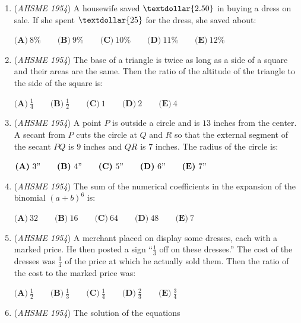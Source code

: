 \begin{enumerate}
 $\textbf{(A)}\ 1 \frac{13}{16} \qquad \textbf{(B)}\ 1 \frac{3}{16} \qquad \textbf{(C)}\ 1 \qquad \textbf{(D)}\ \frac{7}{8}\qquad\textbf{(E)}\ \frac{1}{16}$


	\item (\textit{AHSME 1954}) A housewife saved $\textdollar{2.50}$ in buying a dress on sale. If she spent $\textdollar{25}$ for the dress, she saved about: 


 $\textbf{(A)}\ 8 \% \qquad \textbf{(B)}\ 9 \% \qquad \textbf{(C)}\ 10 \% \qquad \textbf{(D)}\ 11 \% \qquad \textbf{(E)}\ 12\%$


	\item (\textit{AHSME 1954}) The base of a triangle is twice as long as a side of a square and their areas are the same. 
Then the ratio of the altitude of the triangle to the side of the square is: 


 $\textbf{(A)}\ \frac{1}{4} \qquad \textbf{(B)}\ \frac{1}{2} \qquad \textbf{(C)}\ 1 \qquad \textbf{(D)}\ 2 \qquad \textbf{(E)}\ 4$


	\item (\textit{AHSME 1954}) A point $P$ is outside a circle and is $13$ inches from the center. A secant from $P$ cuts the circle at $Q$ and $R$ 
so that the external segment of the secant $PQ$ is $9$ inches and $QR$ is $7$ inches. The radius of the circle is: 


 $\textbf{(A)}\ 3" \qquad \textbf{(B)}\ 4" \qquad \textbf{(C)}\ 5" \qquad \textbf{(D)}\ 6"\qquad\textbf{(E)}\ 7"$


	\item (\textit{AHSME 1954}) The sum of the numerical coefficients in the expansion of the binomial $(a+b)^6$ is: 


 $\textbf{(A)}\ 32 \qquad \textbf{(B)}\ 16 \qquad \textbf{(C)}\ 64 \qquad \textbf{(D)}\ 48 \qquad \textbf{(E)}\ 7$


	\item (\textit{AHSME 1954}) A merchant placed on display some dresses, each with a marked price. He then posted a sign “$\frac{1}{3}$ off on these dresses.” 
The cost of the dresses was $\frac{3}{4}$ of the price at which he actually sold them. Then the ratio of the cost to the marked price was: 


 $\textbf{(A)}\ \frac{1}{2} \qquad \textbf{(B)}\ \frac{1}{3} \qquad \textbf{(C)}\ \frac{1}{4} \qquad \textbf{(D)}\ \frac{2}{3}\qquad\textbf{(E)}\ \frac{3}{4}$


	\item (\textit{AHSME 1954}) The solution of the equations 



\end{enumerate}
